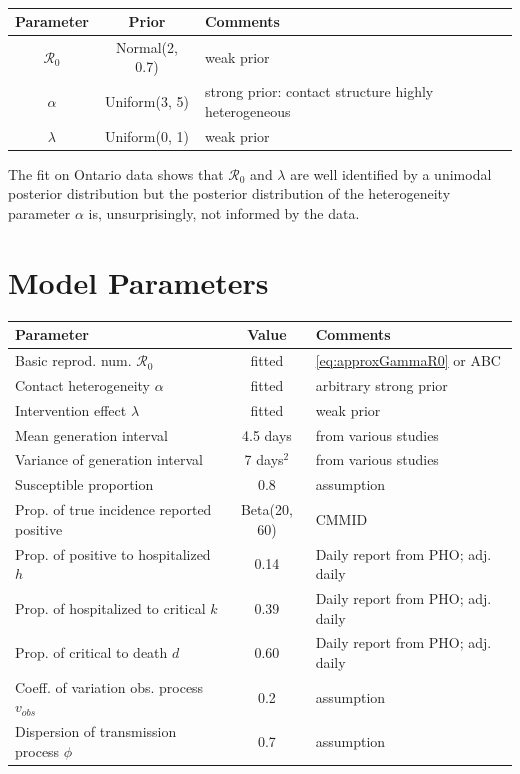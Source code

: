 \documentclass[12pt]{article}
\newcommand{\Ro}{\mathcal{R}_0}
\begin{document}
\begin{table}[h!]
\caption{}
\begin{center}
\begin{tabular}{cc p{6cm}}
\hline
\bf Parameter & \bf Prior & \bf Comments \\
\hline
$\Ro$ & Normal(2, 0.7) & weak prior\\
$\alpha$ & Uniform(3, 5) & strong prior: contact structure highly heterogeneous\\
$\lambda$ & Uniform(0, 1) & weak prior \\
\hline
\end{tabular}
\end{center}
\label{tab:priors}
\end{table}%

The fit on Ontario data shows that $\Ro$ and $\lambda$ are well identified by a unimodal posterior distribution but the posterior distribution of the heterogeneity parameter $\alpha$ is, unsurprisingly, not informed by the data.


\section{Model Parameters}



\renewcommand{\arraystretch}{1.3} 
\begin{table}[h!]
\begin{center}
\begin{small}
\begin{tabular}{l c p{6cm}}
\hline
\bf Parameter & \bf Value & \bf Comments \\
\hline
Basic reprod. num. $\Ro$ & fitted  & \autoref{eq:approxGammaR0} or ABC\\
Contact heterogeneity $\alpha$ & fitted & arbitrary strong prior\\
Intervention effect $\lambda$ & fitted & weak prior \\
Mean generation interval & 4.5 days & from various studies \\
Variance of generation interval & 7 days$^2$ & from various studies \\
Susceptible proportion &  0.8  & assumption \\
Prop. of true incidence reported positive & Beta(20, 60) & CMMID \\
Prop. of positive to hospitalized $h$ & 0.14 & Daily report from PHO; adj. daily\\
Prop. of hospitalized to critical $k$ & 0.39 & Daily report from PHO; adj. daily \\
Prop. of critical to death $d$ & 0.60 & Daily report from PHO; adj. daily \\
Coeff. of variation obs. process $v_{obs}$ & 0.2 & assumption\\
Dispersion of transmission process $\phi$ & 0.7 & assumption\\
\hline
\end{tabular}
\end{small}
\end{center}
\label{tab:parameters}
\end{table}%
\end{document}
